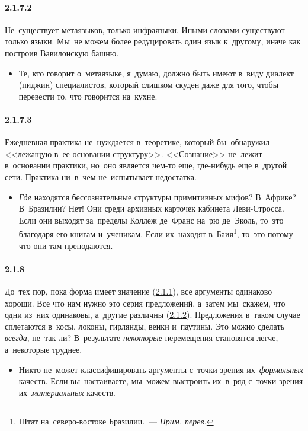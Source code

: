 \paragraph{2.1.7.2}\hypertarget{par:2.1.7.2}{} Не~существует метаязыков, только инфраязыки. Иными словами существуют только языки. Мы~не можем более редуцировать один язык к~другому, иначе как построив Вавилонскую башню. 
	\begin{itemize}
	\item 
	Те, кто говорит о~метаязыке, я~думаю, должно быть имеют в~виду диалект (пиджин) специалистов, который слишком скуден даже для того, чтобы перевести то, что говорится на~кухне.
	\end{itemize}

\paragraph{2.1.7.3}\hypertarget{par:2.1.7.3}{} Ежедневная практика не~нуждается в~теоретике, который бы~обнаружил <<лежащую в~ее основании структуру>>. <<Сознание>> не~лежит в~основании практики, но~оно является чем-то еще, где-нибудь еще в~другой сети. Практика ни~в~чем не~испытывает недостатка. 
	\begin{itemize}
	\item 
	{\itshape Где} находятся бессознательные структуры примитивных мифов? В~Африке? В~Бразилии? Нет! Они среди архивных карточек кабинета Леви-Стросса. Если они выходят за~пределы Коллеж де~Франс на~рю де~Эколь, то~это благодаря его книгам и~ученикам. Если их~находят в~Баия\footnote{Штат на~северо-востоке Бразилии.~--- {\itshape Прим. перев.}}, то~это потому что они там преподаются.
	\end{itemize}

\paragraph{2.1.8}\hypertarget{par:2.1.8}{} До~тех пор, пока форма имеет значение (\hyperlink{par:2.1.1}{2.1.1}), все аргументы одинаково хороши.
Все что нам нужно это серия предложений, а~затем мы~скажем, что одни из~них одинаковы, а~другие различны (\hyperlink{par:2.1.2}{2.1.2}). Предложения в~таком случае сплетаются в~косы, локоны, гирлянды, венки и~паутины. Это можно сделать {\itshape всегда}, не~так ли? В~результате {\itshape некоторые} перемещения становятся легче, а~некоторые труднее. 
	\begin{itemize}
	\item 
	Никто не~может классифицировать аргументы с~точки зрения их~{\itshape формальных} качеств. Если вы~настаиваете, мы~можем выстроить их~в~ряд с~точки зрения их~{\itshape материальных} качеств.
	\end{itemize}

